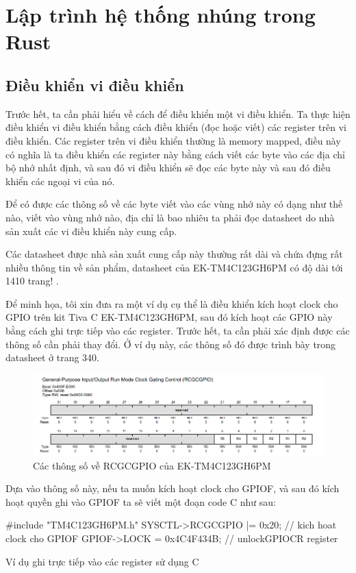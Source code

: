\chapter{Lập trình hệ thống nhúng trong Rust}
\section{Điều khiển vi điều khiển}
Trước hết, ta cần phải hiểu về cách để điều khiển một vi điều khiển.
Ta thực hiện điều khiển vi điều khiển bằng cách điều khiển (đọc hoặc viết) các register trên vi điều khiển.
Các register trên vi điều khiển thường là memory mapped, điều này có nghĩa là ta điều khiển các register này bằng cách viết các byte vào các địa chỉ bộ nhớ nhất định, và sau đó vi điều khiển sẽ đọc các byte này và sau đó điều khiển các ngoại vi của nó.

Để có được các thông số về các byte viết vào các vùng nhớ này có dạng như thế nào, viết vào vùng nhớ nào, địa chỉ là bao nhiêu ta phải đọc datasheet do nhà sản xuất các vi điều khiển này cung cấp.

Các datasheet được nhà sản xuất cung cấp này thường rất dài và chứa đựng rất nhiều thông tin về sản phẩm, datasheet của EK-TM4C123GH6PM có độ dài tới 1410 trang! \cite{tivac_datasheet}.

Để minh họa, tôi xin đưa ra một ví dụ cụ thể là điều khiển kích hoạt clock cho GPIO trên kit Tiva C EK-TM4C123GH6PM, sau đó kích hoạt các GPIO này bằng cách ghi trực tiếp vào các register.
Trước hết, ta cần phải xác định được các thông số cần phải thay đổi. Ở ví dụ này, các thông số đó được trình bày trong datasheet ở trang 340.
\begin{figure}[ht]
\centering
\includegraphics[scale=0.5]{images/tivac_datasheet_example.png}
\caption{Các thông số về RCGCGPIO của EK-TM4C123GH6PM}
\end{figure}

Dựa vào thông số này, nếu ta muốn kích hoạt clock cho GPIOF, và sau đó kích hoạt quyền ghi vào GPIOF ta sẽ viết một đoạn code C như sau:
\begin{listing}[ht]
\begin{ccode}
#include "TM4C123GH6PM.h"
SYSCTL->RCGCGPIO |= 0x20; // kich hoat clock cho GPIOF
GPIOF->LOCK = 0x4C4F434B; // unlockGPIOCR register
\end{ccode}
\caption{Ví dụ ghi trực tiếp vào các register sử dụng C}
\end{listing}

